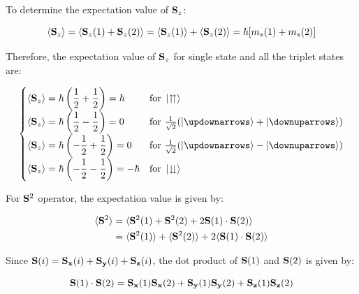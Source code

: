 \documentclass[11pt]{article}
\begin{document}
      To determine the expectation value of $\vb{S}_z$:

      \begin{equation}
          \langle \vb{S}_z \rangle = \langle \vb{S}_z(1) + \vb{S}_z(2) \rangle = \langle \vb{S}_z(1) \rangle + \langle \vb{S}_z(2) \rangle = \hbar[m_s(1) + m_s(2)]
      \end{equation}

      Therefore, the expectation value of $\vb{S}_z$ for single state and all the triplet states are:

      \begin{equation}
      \begin{cases}
          \displaystyle
          \langle \vb{S}_z \rangle = \hbar \left( \frac{1}{2} + \frac{1}{2} \right) = \hbar & \text{for } \ket{\upuparrows} \\
          \displaystyle
          \langle \vb{S}_z \rangle = \hbar \left( \frac{1}{2} - \frac{1}{2} \right) = 0 &  \text{for } \frac{1}{\sqrt{2}}(\ket{\updownarrows} + \ket{\downuparrows}) \\
          \displaystyle
          \langle \vb{S}_z \rangle = \hbar \left( -\frac{1}{2} + \frac{1}{2} \right) = 0 & \text{for } \frac{1}{\sqrt{2}}(\ket{\updownarrows} - \ket{\downuparrows}) \\
          \displaystyle
          \langle \vb{S}_z \rangle = \hbar \left( -\frac{1}{2} - \frac{1}{2} \right) = -\hbar & \text{for } \ket{\downdownarrows} \\
      \end{cases}
      \end{equation}

      For $\vb{S}^2$ operator, the expectation value is given by:

      \begin{align}
          \langle \vb{S}^2 \rangle 
          &= \langle \vb{S}^2(1) + \vb{S}^2(2) + 2\vb{S}(1)\cdot\vb{S}(2) \rangle \\
          &= \langle \vb{S}^2(1) \rangle + \langle \vb{S}^2(2) \rangle + 2\langle \vb{S}(1)\cdot\vb{S}(2) \rangle
      \end{align}

      Since $\vb{S}(i) = \vb{S_x}(i) + \vb{S_y}(i) + \vb{S_z}(i)$, the dot product of $\vb{S}(1)$ and $\vb{S}(2)$ is given by:

      \begin{equation}
          \vb{S}(1)\cdot\vb{S}(2) = \vb{S_x}(1)\vb{S_x}(2) + \vb{S_y}(1)\vb{S_y}(2) + \vb{S_z}(1)\vb{S_z}(2)
      \end{equation}
\end{document}
